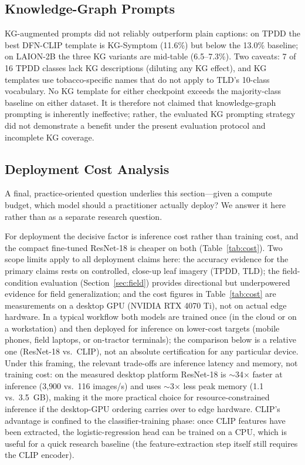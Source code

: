 \documentclass[10pt,a4paper]{article}
\begin{document}
\subsection{Knowledge-Graph Prompts}

KG-augmented prompts did not reliably outperform plain captions: on TPDD the best DFN-CLIP template is KG-Symptom (11.6\%) but below the 13.0\% baseline; on LAION-2B the three KG variants are mid-table (6.5--7.3\%). Two caveats: 7 of 16 TPDD classes lack KG descriptions (diluting any KG effect), and KG templates use tobacco-specific names that do not apply to TLD's 10-class vocabulary. No KG template for either checkpoint exceeds the majority-class baseline on either dataset.
It is therefore not claimed that knowledge-graph prompting is inherently ineffective; rather, the evaluated KG prompting strategy did not demonstrate a benefit under the present evaluation protocol and incomplete KG coverage.

\subsection{Deployment Cost Analysis}

A final, practice-oriented question underlies this section---given a compute budget, which model should a practitioner actually deploy? We answer it here rather than as a separate research question.

For deployment the decisive factor is inference cost rather than training cost, and the compact fine-tuned ResNet-18 is cheaper on both (Table~\ref{tab:cost}). Two scope limits apply to all deployment claims here: the accuracy evidence for the primary claims rests on controlled, close-up leaf imagery (TPDD, TLD); the field-condition evaluation (Section~\ref{sec:field}) provides directional but underpowered evidence for field generalization; and the cost figures in Table~\ref{tab:cost} are measurements on a desktop GPU (NVIDIA RTX 4070 Ti), not on actual edge hardware.
In a typical workflow both models are trained once (in the cloud or on a workstation) and then deployed for inference on lower-cost targets (mobile phones, field laptops, or on-tractor terminals); the comparison below is a relative one (ResNet-18 vs.\ CLIP), not an absolute certification for any particular device.
Under this framing, the relevant trade-offs are inference latency and memory, not training cost: on the measured desktop platform ResNet-18 is $\sim$34$\times$ faster at inference (3{,}900 vs.\ 116 images/s) and uses $\sim$3$\times$ less peak memory (1.1 vs.\ 3.5~GB), making it the more practical choice for resource-constrained inference if the desktop-GPU ordering carries over to edge hardware.
CLIP's advantage is confined to the classifier-training phase: once CLIP features have been extracted, the logistic-regression head can be trained on a CPU, which is useful for a quick research baseline (the feature-extraction step itself still requires the CLIP encoder).
\end{document}
